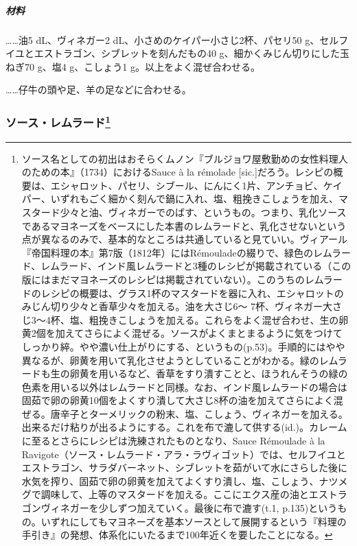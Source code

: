\begin{recette}
\hypertarget{ux6750ux6599}{%
\subparagraph{材料}\label{ux6750ux6599}}

\ldots{}\ldots{}油5 dL、ヴィネガー2
dL、小さめのケイパー小さじ2杯、パセリ50
g、セルフイユとエストラゴン、シブレットを刻んだもの40
g、細かくみじん切りにした玉ねぎ70 g、塩4 g、こしょう1
g。以上をよく混ぜ合わせる。

\ldots{}\ldots{}仔牛の頭や足、羊の足などに合わせる。

\atoaki{}

\hypertarget{sauce-remoulade}{%
\subsubsection[ソース・レムラード]{\texorpdfstring{ソース・レムラード\footnote{ソース名としての初出はおそらくムノン『ブルジョワ屋敷勤めの女性料理人のための本』（1734）におけるSauce
  à la rémolade
  {[}sic.{]}だろう。レシピの概要は、エシャロット、パセリ、シブール、にんにく1片、アンチョビ、ケイパー、いずれもごく細かく刻んで鍋に入れ、塩、粗挽きこしょうを加え、マスタード少々と油、ヴィネガーでのばす、というもの。つまり、乳化ソースであるマヨネーズをベースにした本書のレムラードと、乳化させないという点が異なるのみで、基本的なところは共通していると見ていい。ヴィアール『帝国料理の本』第7版（1812年）にはRémouladeの綴りで、緑色のレムラード、レムラード、インド風レムラードと3種のレシピが掲載されている（この版にはまだマヨネーズのレシピは掲載されていない）。このうちのレムラードのレシピの概要は、グラス1杯のマスタードを器に入れ、エシャロットのみじん切り少々と香草少々を加える。油を大さじ6〜
  7杯、ヴィネガー大さじ3〜4杯、塩、粗挽きこしょうを加える。これらをよく混ぜ合わせ、生の卵黄2個を加えてさらによく混ぜる。ソースがよくまとまるように気をつけてしっかり綷。やや濃い仕上がりにする、というもの(p.53)。手順的にはやや異なるが、卵黄を用いて乳化させようとしていることがわかる。緑のレムラードも生の卵黄を用いるなど、香草をすり潰すことと、ほうれんそうの緑の色素を用いる以外はレムラードと同様。なお、インド風レムラードの場合は固茹で卵の卵黄10個をよくすり潰して大さじ8杯の油を加えてさらによく混ぜる。唐辛子とターメリックの粉末、塩、こしょう、ヴィネガーを加える。出来るだけ粘りが出るようにする。これを布で漉して供する(id.)。カレームに至るとさらにレシピは洗練されたものとなり、Sauce
  Rémoulade à la
  Ravigote（ソース・レムラード・アラ・ラヴィゴット）では、セルフイユとエストラゴン、サラダバーネット、シブレットを茹がいて水にさらした後に水気を搾り、固茹で卵の卵黄を加えてよくすり潰し、塩、こしょう、ナツメグで調味して、上等のマスタードを加える。ここにエクス産の油とエストラゴンヴィネガーを少しずつ加えていく。最後に布で漉す(t.1,
  p.135)というもの。いずれにしてもマヨネーズを基本ソースとして展開するという『料理の手引き』の発想、体系化にいたるまで100年近くを要したことになる。}}{ソース・レムラード}}\label{sauce-remoulade}}


\end{recette}
